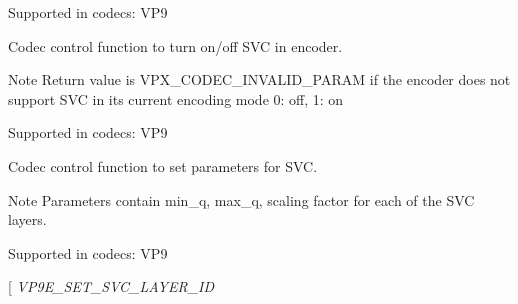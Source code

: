 \begin{Desc}
\begin{description}
Supported in codecs\+: V\+P9 \item[{\em 
V\+P9\+E\+\_\+\+S\+E\+T\+\_\+\+S\+VC\hypertarget{group__vp8__encoder_gga6deae3d561c838952552c3d3756322eca88f29897083911e08434857aeff77407}{}\label{group__vp8__encoder_gga6deae3d561c838952552c3d3756322eca88f29897083911e08434857aeff77407}
}]Codec control function to turn on/off S\+VC in encoder. \begin{DoxyNote}{Note}
Return value is V\+P\+X\+\_\+\+C\+O\+D\+E\+C\+\_\+\+I\+N\+V\+A\+L\+I\+D\+\_\+\+P\+A\+R\+AM if the encoder does not support S\+VC in its current encoding mode 0\+: off, 1\+: on
\end{DoxyNote}
Supported in codecs\+: V\+P9 \item[{\em 
V\+P9\+E\+\_\+\+S\+E\+T\+\_\+\+S\+V\+C\+\_\+\+P\+A\+R\+A\+M\+E\+T\+E\+RS\hypertarget{group__vp8__encoder_gga6deae3d561c838952552c3d3756322eca7836375eec7f50dc580a2a8ace9c9055}{}\label{group__vp8__encoder_gga6deae3d561c838952552c3d3756322eca7836375eec7f50dc580a2a8ace9c9055}
}]Codec control function to set parameters for S\+VC. \begin{DoxyNote}{Note}
Parameters contain min\+\_\+q, max\+\_\+q, scaling factor for each of the S\+VC layers.
\end{DoxyNote}
Supported in codecs\+: V\+P9 \item[{\em 
V\+P9\+E\+\_\+\+S\+E\+T\+\_\+\+S\+V\+C\+\_\+\+L\+A\+Y\+E\+R\+\_\+\+ID\hypertarget{group__vp8__encoder_gga6deae3d561c838952552c3d3756322eca090ad9dcb1f2eea2af60f4737c5bf514}{}\label{group__vp8__encoder_gga6deae3d561c838952552c3d3756322eca090ad9dcb1f2eea2af60f4737c5bf514}
}
\end{description}
\end{Desc}
